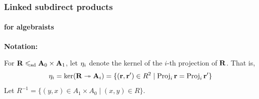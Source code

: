 \documentclass[xcolor=dvipsnames,9pt,hide notes,mathserif]{beamer}
\begin{document}
\begin{frame}
  \frametitle{Linked subdirect products}
  \framesubtitle{for algebraists}
  {\bf Notation:}

  \medskip
  For $\mathbf{R} \leqslant_{\mathrm{sd}} \mathbf{A}_0 \times \mathbf{A}_1$, let $\eta_i$ denote the kernel of the
  $i$-th projection of $\mathbf{R}$. That is,
  \[
  \eta_i = \ker(\mathbf{R} \twoheadrightarrow \mathbf{A}_i) = \{(\mathbf{r}, \mathbf{r}')\in R^2 \mid \operatorname{Proj}_i \mathbf{r} =
  \operatorname{Proj}_i \mathbf{r}'\}
  \]
  Let $R^{-1} = \{(y,x) \in A_1 \times A_0 \mid (x,y) \in R\}$.

  \bigskip

  \bigskip


\end{frame}
\end{document}
